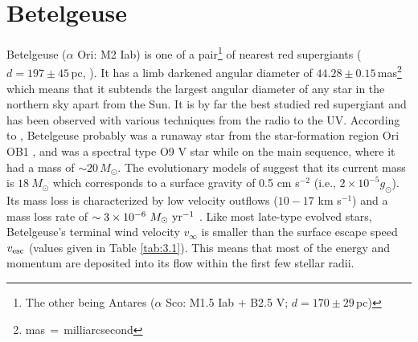 \section{Betelgeuse}\label{sec:3.1}
Betelgeuse ($\alpha$ Ori: M2 Iab) is one of a pair\footnote{The other being Antares ($\alpha$ Sco: M1.5 Iab + B2.5 V; $d=170 \pm 29$\,pc)} of nearest red supergiants ($d = 197 \pm 45$\,pc, \citealt{harper_2008}). It has a limb darkened angular diameter of $44.28 \pm 0.15$\,mas\footnote{mas$\,=\,$milliarcsecond} \citep{haubois_2009} which means that it subtends the largest angular diameter of any star in the northern sky apart from the Sun. It is by far the best studied red supergiant and has been observed with various techniques from the radio to the UV. According to \cite{harper_2001}, Betelgeuse probably was a runaway star from the star-formation region Ori OB1 \cite[see, e.g.,][]{hoogerwerf_2000}, and was a spectral type O9 V star while on the main sequence, where it had a mass of $\sim 20\,M_{\odot}$. The evolutionary models of \cite{meynet_2003} suggest that its current mass is $18 \ M_{\odot}$ which corresponds to a surface gravity of 0.5 cm s$^{-2}$  (i.e., $2\times 10^{-5}g_{\odot}$). Its mass loss is characterized by low velocity outflows ($10-17$ km s$^{-1}$) and a mass loss rate of $\sim 3\times 10^{-6} \ M_{\odot} \ \rm{yr}^{-1}$ \citep{harper_2001}. Like most late-type evolved stars, Betelgeuse's  terminal wind velocity $v_{\infty}$ is smaller than the surface escape speed $v_{\rm{esc}}$ (values given in Table \ref{tab:3.1}). This means that most of the energy and momentum are deposited into its flow within the first few stellar radii.

